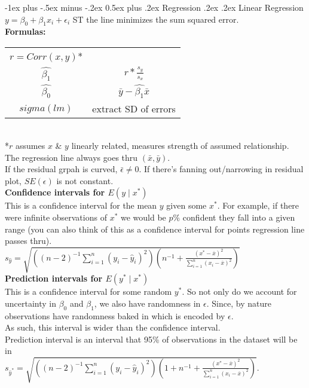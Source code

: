 \documentclass[10pt,landscape]{article}
\makeatletter
\renewcommand{\section}{\@startsection{section}{1}{0mm}%
                                {-1ex plus -.5ex minus -.2ex}%
                                {0.5ex plus .2ex}%
                                {\normalfont\large\bfseries}}
\renewcommand{\subsection}{\@startsection{subsection}{2}{0mm}%
                                {.2ex}%
                                {.2ex}%
                                {\normalfont\normalsize\bfseries}}
\makeatother
\begin{document}
\begin{multicols}{3}
\section{Regression}
\subsection{Linear Regression}
$y = \beta_0 + \beta_1x_i + \epsilon_i$ ST the line minimizes the sum squared error. \\
\textbf{Formulas:} \\
\begin{tabular}{@{}c@{}c@{}}
        $r = Corr(x, y)$* & \hskip.5em $\frac{1}{n - 1}\sum_{i = 1}^{n}\frac{x_i-\bar{x}}{s_x}\frac{y_i-\bar{y}}{s_y}$\\
        $\hat{\beta_1}$ & $r * \frac{s_y}{s_x}$ \\        
        $\hat{\beta_0}$ & $\bar{y} - \hat{\beta_1}\bar{x}$ \\  
        $sigma(lm)$ & extract SD of errors      
\end{tabular} \\
        *$r$ assumes $x$ \& $y$ linearly related, measures strength of assumed relationship. \\
        The regression line always goes thru $(\bar{x}, \bar{y})$. \\
        If the residual grpah is curved, $\bar{\epsilon} \ne 0$. If there's fanning out/narrowing in residual plot, $SE(\epsilon)$ is not constant. \\
        \textbf{Confidence intervals for $E(y \mid x^*)$} \\
        This is a confidence interval for the mean $y$ given some $x^*$. 
        For example, if there were infinite observations of $x^*$ we would be $p\%$ confident they fall into a given range (you can also think of this as a confidence interval for points regression line passes thru). \\
        $s_{\hat{y}} = \sqrt{\left((n-2)^{-1} \sum_{i=1}^n(y_i - \hat{y}_i)^2\right)\left(n^{-1} + \frac{(x^* - \overline{x})^2}{\sum_{i = 1}^n (x_i - \overline{x})^2} \right)}$ \\
        \textbf{Prediction intervals for $E(y^* \mid x^*)$} \\
        This is a confidence interval for some random $y^*$. So not only do we account for uncertainty in $\beta_0$ and $\beta_1$, we also have randomness in $\epsilon$. Since, by nature observations have randomness baked in which is encoded by $\epsilon$. \\
        As such, this interval is wider than the confidence interval. \\
        Prediction interval is an interval that 95\% of observations in the dataset will be in \\
        $s_{\hat{y}^*} = \sqrt{\left((n-2)^{-1} \sum_{i=1}^n(y_i - \hat{y}_i)^2\right)\left(1 + n^{-1} + \frac{(x^* - \overline{x})^2}{\sum_{i = 1}^n (x_i - \overline{x})^2} \right)}$. \\

\end{multicols}
\end{document}
